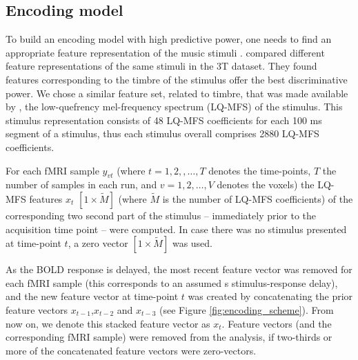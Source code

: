 \subsection*{Encoding model}

To build an encoding model with high predictive power, one needs to find an appropriate feature representation of the music stimuli \citep{holdgraf2017encoding}. \citet{CTK+2012} compared different feature representations of the same stimuli in the 3T dataset. They found features corresponding to the timbre of the stimulus offer the best discriminative power. We chose a similar feature set, related to timbre, that was made available by \citet{HDH+2015}, the low-quefrency mel-frequency spectrum (LQ-MFS) of the stimulus. This stimulus representation consists of 48 LQ-MFS coefficients for each 100 ms segment of a stimulus, thus each stimulus overall comprises 2880 LQ-MFS coefficients.

For each f{MRI} sample $y_{vt}$ (where $t=1,2,,\ldots,T$ denotes the time-points, $T$ the number of samples in each run, and $v=1,2,\ldots,V$ denotes the voxels) the LQ-MFS features $x_{t}$ $[1\times\widetilde{M}]$ (where $\widetilde{M}$ is the number of LQ-MFS coefficients) of the corresponding two second part of the stimulus -- immediately prior to the acquisition time point -- were computed. In case there was no stimulus presented at time-point $t$, a zero vector $[1\times\widetilde{M}]$ was used. 

As the BOLD response is delayed,  the most recent feature vector was removed for each f{MRI} sample (this corresponds to an assumed \unit[2]{s} stimulus-response delay), and the new feature vector at time-point $t$ was created by concatenating the prior feature vectors $x_{t-1}$,$x_{t-2}$ and $x_{t-3}$ (see Figure \ref{fig:encoding_scheme}). From now on, we denote this stacked feature vector as $x_{t}$.  Feature vectors (and the corresponding f{MRI} sample) were removed from the analysis, if two-thirds or more of the concatenated feature vectors were zero-vectors.

